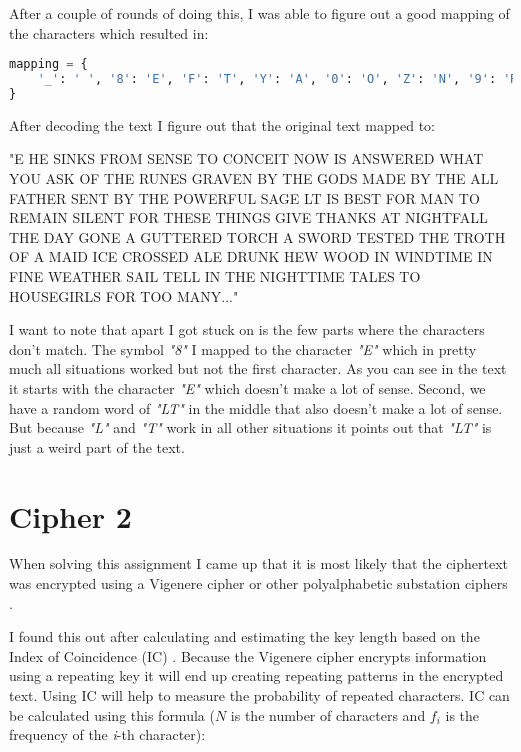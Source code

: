 \documentclass{article}
\begin{document}
After a couple of rounds of doing this, I was able to figure out a good mapping of the characters which resulted in:

\begin{lstlisting}[language=Python]
mapping = {
    '_': ' ', '8': 'E', 'F': 'T', 'Y': 'A', '0': 'O', 'Z': 'N', '9': 'R', 'C': 'S', 'K': 'I', 'H': 'H', 'T': 'L', '5': 'D', 'O': 'W', 'B': 'F', 'I': 'U', 'W': 'M', 'E': 'G', '2': 'C', 'U': 'Y', '#': 'B', '3': 'P', 'Q': 'K', 'L': 'V', '1': '\n', 'R': 'X', 'N': 'J', '6': 'Q', 'X': 'Z'
}
\end{lstlisting}

After decoding the text I figure out that the original text mapped to:

"E HE SINKS FROM SENSE TO CONCEIT
NOW IS ANSWERED WHAT YOU ASK OF THE RUNES GRAVEN BY THE GODS MADE BY THE ALL FATHER SENT BY THE POWERFUL SAGE LT IS BEST FOR MAN TO REMAIN SILENT
FOR THESE THINGS GIVE THANKS AT NIGHTFALL THE DAY GONE A GUTTERED TORCH A SWORD TESTED THE TROTH OF A MAID ICE CROSSED ALE DRUNK
HEW WOOD IN WINDTIME IN FINE WEATHER SAIL TELL IN THE NIGHTTIME TALES TO HOUSEGIRLS FOR TOO MANY..."

I want to note that apart I got stuck on is the few parts where the characters don't match. The symbol \textit{"8"} I mapped to the character \textit{"E"} which in pretty much all situations worked but not the first character. As you can see in the text it starts with the character \textit{"E"} which doesn't make a lot of sense. Second, we have a random word of \textit{"LT"} in the middle that also doesn't make a lot of sense. But because \textit{"L"} and \textit{"T"} work in all other situations it points out that \textit{"LT"} is just a weird part of the text.

\section*{Cipher 2}
When solving this assignment I came up that it is most likely that the ciphertext was encrypted using a Vigenere cipher or other polyalphabetic substation ciphers \cite{lecture2}.

I found this out after calculating and estimating the key length based on the Index of Coincidence (IC) \cite{christensen2015cryptanalysis}. Because the Vigenere cipher encrypts information using a repeating key it will end up creating repeating patterns in the encrypted text. Using IC will help to measure the probability of repeated characters. IC can be calculated using this formula (\(N\) is the number of characters and \(f_i\) is the frequency of the \textit{i}-th character):
\end{document}
